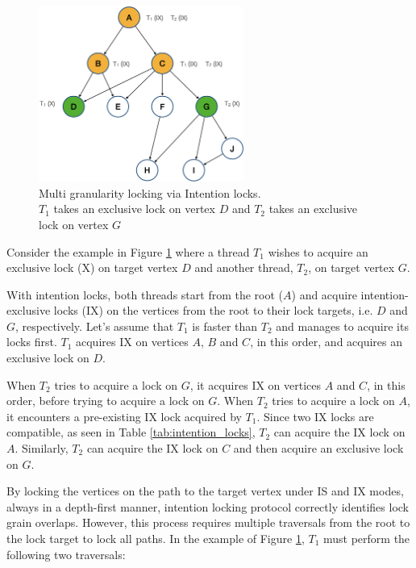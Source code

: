 \begin{figure}[h]
    \centering
    \captionsetup{justification=centering}
    \includegraphics[width=0.6\textwidth]{figures/IntentionLockExample.png}
    \caption{Multi granularity locking via Intention locks. \\ $T_1$ takes an exclusive lock on vertex $D$ and $T_2$ takes an exclusive lock on vertex $G$ }
    \label{fig:intention_lock_example}
\end{figure}

Consider the example in Figure \ref{fig:intention_lock_example} where a thread $T_1$ wishes to acquire an exclusive lock (X) on target vertex $D$ and another thread, $T_2$, on target vertex $G$. 

With intention locks, both threads start from the root ($A$) and acquire intention-exclusive locks (IX) on the vertices from the root to their lock targets, i.e. $D$ and $G$, respectively. 
Let's assume that $T_1$ is faster than $T_2$ and manages to acquire its locks first. 
$T_1$ acquires IX on vertices $A$, $B$ and $C$, in this order, and acquires an exclusive lock on $D$. 

When $T_2$ tries to acquire a lock on $G$, it acquires IX on vertices $A$ and $C$, in this order, before trying to acquire a lock on $G$. 
When $T_2$ tries to acquire a lock on $A$, it encounters a pre-existing  IX lock acquired by $T_1$. 
Since two IX locks are compatible, as seen in Table \ref{tab:intention_locks}, $T_2$ can acquire the IX lock on $A$.
Similarly, $T_2$ can acquire the IX lock on $C$ and then acquire an exclusive lock on $G$.


By locking the vertices on the path to the target vertex under IS and IX modes, always in a depth-first manner, 
intention locking protocol correctly identifies lock grain overlaps. 
However, this process requires multiple traversals from the root to the lock target to lock all paths. 
In the example of Figure \ref{fig:intention_lock_example}, $T_1$ must perform the following two traversals:

